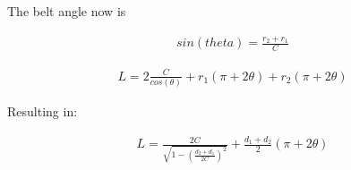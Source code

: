 \documentclass[10pt,letterpaper]{article}
\begin{document}
	The belt angle now is

	\begin{align}
		sin(theta) = \frac{r_2 + r_1}{C} 
	\end{align}

	\begin{align}
		L = 2 \frac{C}{cos(\theta)} + r_1 (\pi + 2 \theta) + r_2 (\pi + 2 \theta)
	\end{align}

	Resulting in:

	\begin{align}
		L = \frac{2 C}{\sqrt{1 - (\frac{d_2 + d_1}{2 C})^2}} + \frac{d_1 + d_2}{2} (\pi + 2 \theta)
	\end{align}
	
	
\end{document}
